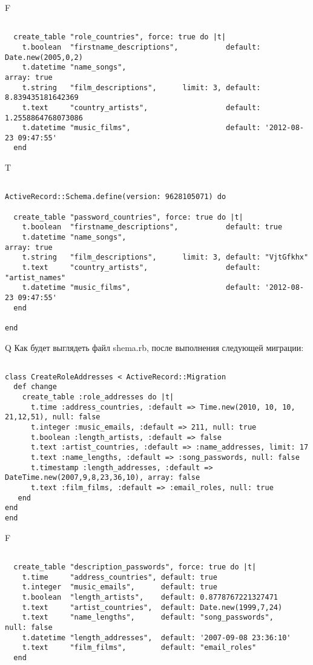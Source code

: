 F
\begin{verbatim}

  create_table "role_countries", force: true do |t|
    t.boolean  "firstname_descriptions",           default: Date.new(2005,0,2)
    t.datetime "name_songs",                                                       array: true
    t.string   "film_descriptions",      limit: 3, default: 8.839435181642369
    t.text     "country_artists",                  default: 1.2558864768073086
    t.datetime "music_films",                      default: '2012-08-23 09:47:55'
  end

\end{verbatim}

T
\begin{verbatim}

ActiveRecord::Schema.define(version: 9628105071) do

  create_table "password_countries", force: true do |t|
    t.boolean  "firstname_descriptions",           default: true
    t.datetime "name_songs",                                                       array: true
    t.string   "film_descriptions",      limit: 3, default: "VjtGfkhx"
    t.text     "country_artists",                  default: "artist_names"
    t.datetime "music_films",                      default: '2012-08-23 09:47:55'
  end

end
\end{verbatim}

Q
Как будет выглядеть файл shema.rb, после выполнения следующей миграции:

\begin{verbatim}

class CreateRoleAddresses < ActiveRecord::Migration 
  def change 
    create_table :role_addresses do |t| 
      t.time :address_countries, :default => Time.new(2010, 10, 10, 21,12,51), null: false
      t.integer :music_emails, :default => 211, null: true
      t.boolean :length_artists, :default => false
      t.text :artist_countries, :default => :name_addresses, limit: 17
      t.text :name_lengths, :default => :song_passwords, null: false
      t.timestamp :length_addresses, :default => DateTime.new(2007,9,8,23,36,10), array: false
      t.text :film_films, :default => :email_roles, null: true
   end
end
end
\end{verbatim}

F
\begin{verbatim}

  create_table "description_passwords", force: true do |t|
    t.time     "address_countries", default: true
    t.integer  "music_emails",      default: true
    t.boolean  "length_artists",    default: 0.8778767221327471
    t.text     "artist_countries",  default: Date.new(1999,7,24)
    t.text     "name_lengths",      default: "song_passwords",      null: false
    t.datetime "length_addresses",  default: '2007-09-08 23:36:10'
    t.text     "film_films",        default: "email_roles"
  end

\end{verbatim}

